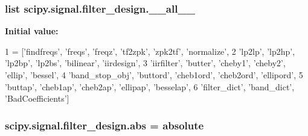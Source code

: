 \subsubsection[{\+\_\+\+\_\+all\+\_\+\+\_\+}]{\setlength{\rightskip}{0pt plus 5cm}list scipy.\+signal.\+filter\+\_\+design.\+\_\+\+\_\+all\+\_\+\+\_\+}\label{namespacescipy_1_1signal_1_1filter__design_af0972d6b8a9b21621b707b844c4f9f98}
{\bfseries Initial value\+:}
\begin{DoxyCode}
1 = [\textcolor{stringliteral}{'findfreqs'}, \textcolor{stringliteral}{'freqs'}, \textcolor{stringliteral}{'freqz'}, \textcolor{stringliteral}{'tf2zpk'}, \textcolor{stringliteral}{'zpk2tf'}, \textcolor{stringliteral}{'normalize'},
2            \textcolor{stringliteral}{'lp2lp'}, \textcolor{stringliteral}{'lp2hp'}, \textcolor{stringliteral}{'lp2bp'}, \textcolor{stringliteral}{'lp2bs'}, \textcolor{stringliteral}{'bilinear'}, \textcolor{stringliteral}{'iirdesign'},
3            \textcolor{stringliteral}{'iirfilter'}, \textcolor{stringliteral}{'butter'}, \textcolor{stringliteral}{'cheby1'}, \textcolor{stringliteral}{'cheby2'}, \textcolor{stringliteral}{'ellip'}, \textcolor{stringliteral}{'bessel'},
4            \textcolor{stringliteral}{'band\_stop\_obj'}, \textcolor{stringliteral}{'buttord'}, \textcolor{stringliteral}{'cheb1ord'}, \textcolor{stringliteral}{'cheb2ord'}, \textcolor{stringliteral}{'ellipord'},
5            \textcolor{stringliteral}{'buttap'}, \textcolor{stringliteral}{'cheb1ap'}, \textcolor{stringliteral}{'cheb2ap'}, \textcolor{stringliteral}{'ellipap'}, \textcolor{stringliteral}{'besselap'},
6            \textcolor{stringliteral}{'filter\_dict'}, \textcolor{stringliteral}{'band\_dict'}, \textcolor{stringliteral}{'BadCoefficients'}]
\end{DoxyCode}
\hypertarget{namespacescipy_1_1signal_1_1filter__design_a6573ad6621291c2b1e1ba5ebe9dacc8b}{}
\subsubsection[{abs}]{\setlength{\rightskip}{0pt plus 5cm}scipy.\+signal.\+filter\+\_\+design.\+abs = absolute}\label{namespacescipy_1_1signal_1_1filter__design_a6573ad6621291c2b1e1ba5ebe9dacc8b}
\hypertarget{namespacescipy_1_1signal_1_1filter__design_a3568772c57d8bb86cfe4133f6d3c738f}{}
